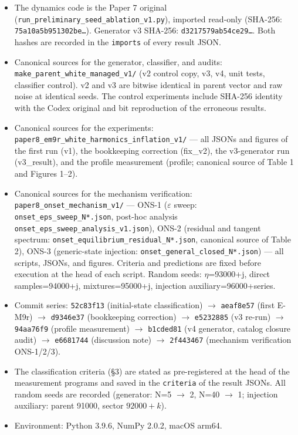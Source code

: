 \documentclass[
  a4paper,
]{article}
\providecommand{\tightlist}{%
  \setlength{\itemsep}{0pt}\setlength{\parskip}{0pt}}
\begin{document}
\begin{itemize}
\tightlist
\item
  The dynamics code is the Paper 7 original
  (\texttt{run\_preliminary\_seed\_ablation\_v1.py}), imported read-only
  (SHA-256: \texttt{75a10a5b951302be…}). Generator v3 SHA-256:
  \texttt{d3217579ab54ce29…}. Both hashes are recorded in the
  \texttt{imports} of every result JSON.
\item
  Canonical sources for the generator, classifier, and audits:
  \texttt{make\_parent\_white\_managed\_v1/} (v2 control copy, v3, v4,
  unit tests, classifier control). v2 and v3 are bitwise identical in
  parent vector and raw noise at identical seeds. The control
  experiments include SHA-256 identity with the Codex original and bit
  reproduction of the erroneous results.
\item
  Canonical sources for the experiments:
  \texttt{paper8\_em9r\_white\_harmonics\_inflation\_v1/} --- all JSONs
  and figures of the first run (v1), the bookkeeping correction
  (fix\_v2), the v3-generator run (v3\_result), and the profile
  measurement (profile; canonical source of Table 1 and Figures 1--2).
\item
  Canonical sources for the mechanism verification:
  \texttt{paper8\_onset\_mechanism\_v1/} --- ONS-1 (\(\varepsilon\)
  sweep: \texttt{onset\_eps\_sweep\_N*.json}, post-hoc analysis
  \texttt{onset\_eps\_sweep\_analysis\_v1.json}), ONS-2 (residual and
  tangent spectrum: \texttt{onset\_equilibrium\_residual\_N*.json},
  canonical source of Table 2), ONS-3 (generic-state injection:
  \texttt{onset\_general\_closed\_N*.json}) --- all scripts, JSONs, and
  figures. Criteria and predictions are fixed before execution at the
  head of each script. Random seeds: \(\eta\)=93000+j, direct
  samples=94000+j, mixtures=95000+j, injection auxiliary=96000+series.
\item
  Commit series: \texttt{52c83f13} (initial-state classification)
  \(\to\) \texttt{aeaf8e57} (first E-M9r) \(\to\) \texttt{d9346e37}
  (bookkeeping correction) \(\to\) \texttt{e5232885} (v3 re-run) \(\to\)
  \texttt{94aa76f9} (profile measurement) \(\to\) \texttt{b1cded81} (v4
  generator, catalog closure audit) \(\to\) \texttt{e6681744}
  (discussion note) \(\to\) \texttt{2f443467} (mechanism verification
  ONS-1/2/3).
\item
  The classification criteria (§3) are stated as pre-registered at the
  head of the measurement programs and saved in the \texttt{criteria} of
  the result JSONs. All random seeds are recorded (generator: N=5
  \(\to\) 2, N=40 \(\to\) 1; injection auxiliary: parent 91000, sector
  \(92000+k\)).
\item
  Environment: Python 3.9.6, NumPy 2.0.2, macOS arm64.
\end{itemize}
\end{document}
